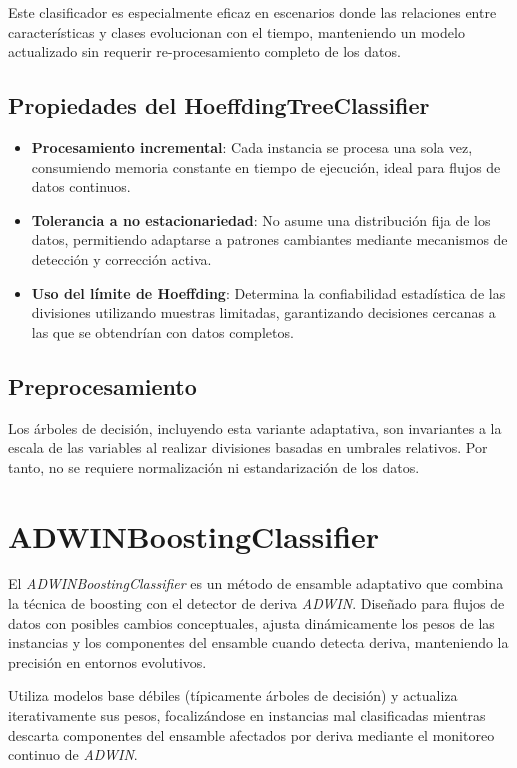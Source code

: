 \documentclass[12pt,letterpaper]{article}
\begin{document}
Este clasificador es especialmente eficaz en escenarios donde las relaciones entre características y clases evolucionan con el tiempo, manteniendo un modelo actualizado sin requerir re-procesamiento completo de los datos.

\subsection{Propiedades del HoeffdingTreeClassifier}
\begin{itemize}
    \item \textbf{Procesamiento incremental}: Cada instancia se procesa una sola vez, consumiendo memoria constante en tiempo de ejecución, ideal para flujos de datos continuos.
    \item \textbf{Tolerancia a no estacionariedad}: No asume una distribución fija de los datos, permitiendo adaptarse a patrones cambiantes mediante mecanismos de detección y corrección activa.
    \item \textbf{Uso del límite de Hoeffding}: Determina la confiabilidad estadística de las divisiones utilizando muestras limitadas, garantizando decisiones cercanas a las que se obtendrían con datos completos.
\end{itemize}

\subsection{Preprocesamiento}
Los árboles de decisión, incluyendo esta variante adaptativa, son invariantes a la escala de las variables al realizar divisiones basadas en umbrales relativos. Por tanto, no se requiere normalización ni estandarización de los datos.

\section{ADWINBoostingClassifier}
El \textit{ADWINBoostingClassifier} \cite{Oza2005} es un método de ensamble adaptativo que combina la técnica de boosting con el detector de deriva \textit{ADWIN}. Diseñado para flujos de datos con posibles cambios conceptuales, ajusta dinámicamente los pesos de las instancias y los componentes del ensamble cuando detecta deriva, manteniendo la precisión en entornos evolutivos.

Utiliza modelos base débiles (típicamente árboles de decisión) y actualiza iterativamente sus pesos, focalizándose en instancias mal clasificadas mientras descarta componentes del ensamble afectados por deriva mediante el monitoreo continuo de \textit{ADWIN}.
\end{document}
